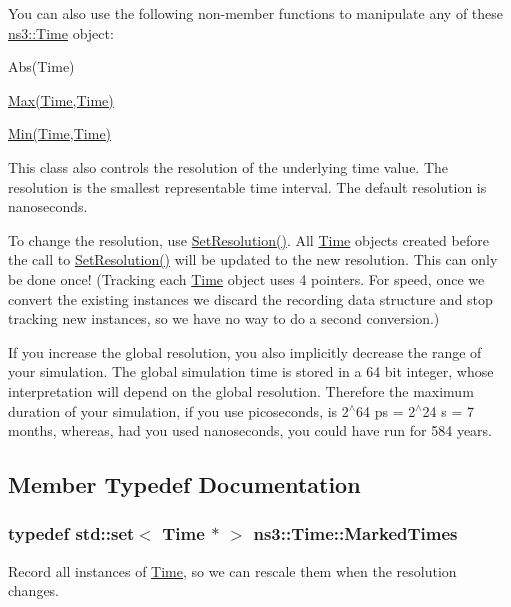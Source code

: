 You can also use the following non-\/member functions to manipulate any of these \hyperlink{classns3_1_1Time}{ns3\+::\+Time} object\+:
\begin{DoxyItemize}
\item Abs(\+Time)
\item \hyperlink{minstrel-ht-wifi-manager_8cc_a4886a8f966a69949cefc46a6a3468006}{Max(\+Time,\+Time)}
\item \hyperlink{rraa-wifi-manager_8cc_a9e04209162ea72f9985338596262b657}{Min(\+Time,\+Time)}
\end{DoxyItemize}

This class also controls the resolution of the underlying time value. The resolution is the smallest representable time interval. The default resolution is nanoseconds.

To change the resolution, use \hyperlink{classns3_1_1Time_ac89165ba7715b66017a49c718f4aef09}{Set\+Resolution()}. All \hyperlink{classns3_1_1Time}{Time} objects created before the call to \hyperlink{classns3_1_1Time_ac89165ba7715b66017a49c718f4aef09}{Set\+Resolution()} will be updated to the new resolution. This can only be done once! (Tracking each \hyperlink{classns3_1_1Time}{Time} object uses 4 pointers. For speed, once we convert the existing instances we discard the recording data structure and stop tracking new instances, so we have no way to do a second conversion.)

If you increase the global resolution, you also implicitly decrease the range of your simulation. The global simulation time is stored in a 64 bit integer, whose interpretation will depend on the global resolution. Therefore the maximum duration of your simulation, if you use picoseconds, is 2$^\wedge$64 ps = 2$^\wedge$24 s = 7 months, whereas, had you used nanoseconds, you could have run for 584 years. 

\subsection{Member Typedef Documentation}
\subsubsection[{\texorpdfstring{Marked\+Times}{MarkedTimes}}]{\setlength{\rightskip}{0pt plus 5cm}typedef std\+::set$<$ {\bf Time} $\ast$ $>$ {\bf ns3\+::\+Time\+::\+Marked\+Times}\hspace{0.3cm}{\ttfamily [private]}}\hypertarget{classns3_1_1Time_add356cdcb7ac7730a0f9ad22770f81cc}{}\label{classns3_1_1Time_add356cdcb7ac7730a0f9ad22770f81cc}
Record all instances of \hyperlink{classns3_1_1Time}{Time}, so we can rescale them when the resolution changes. 

